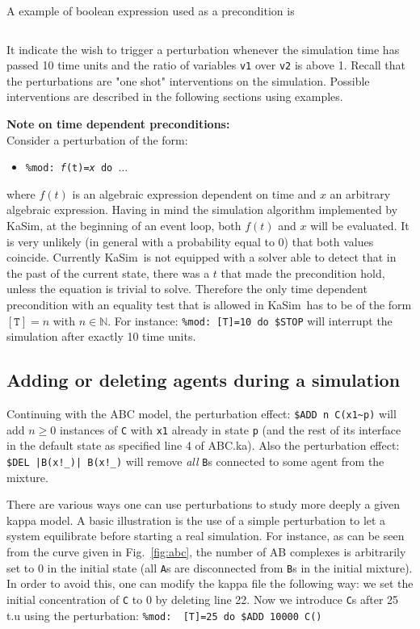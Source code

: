 \documentclass[11pt]{book}
\def\KaSim{\textsf{KaSim}}
\def\ttt#1{\texttt{#1}}
\def\ITE#1{\begin{itemize}#1\end{itemize}}
\def\Nat{\mathbb N}
\begin{document}
A example of boolean expression used as a precondition is
\begin{lstlisting}[language=kappa]
%mod: ([T]>10) && ('v1' / 'v2') > 1 do ...
\end{lstlisting}

It indicate the wish to trigger a perturbation whenever the simulation
time has passed 10 time units and the ratio of variables \ttt{v1} over
\ttt{v2} is above 1. Recall that the perturbations are "one shot"
interventions on the simulation. Possible interventions are described
in the following sections using examples.

\textbf{Note on time dependent preconditions:}
\\Consider a perturbation of the form:
\ITE{
\item[] \ttt{\%mod: {\it f}(t)={\it x} do $\dots$}
}
where $f(t)$ is an algebraic expression dependent on time and $x$ an arbitrary algebraic expression. Having in mind the simulation algorithm implemented by \KaSim, at the beginning of an event loop, both $f(t)$ and $x$ will be evaluated. It is very unlikely (in general with a probability equal to 0) that both values coincide. Currently \KaSim~is not equipped with a solver able to detect that in the past of the current state, there was a $t$ that made the precondition hold, unless the equation is trivial to solve. Therefore the only time dependent precondition with an equality test that is allowed in \KaSim~has to be of the form $\mathtt{[T]=}n$ with $n\in\Nat$. For instance:
\lstinline[language=kappa]*%mod: [T]=10 do $STOP*
will interrupt the simulation after exactly 10 time units.

\subsection{Adding or deleting agents during a simulation}

Continuing with the ABC model, the perturbation effect:
\lstinline[language=kappa]*$ADD n C(x1~p)*
will add $n\geq 0$ instances of \ttt{C} with \ttt{x1} already in state \ttt{p} (and the rest of its interface in the default state as specified line 4 of ABC.ka). Also the perturbation effect:
\lstinline[language=kappa]*$DEL |B(x!_)| B(x!_)*
will remove \emph{all} \ttt{B}s connected to some agent from the mixture.

There are various ways one can use perturbations to study more deeply a given kappa model. A basic illustration is the use of a simple perturbation to let a system equilibrate before starting a real simulation. For instance, as can be seen from the curve given in Fig.~\ref{fig:abc}, the number of AB complexes is arbitrarily set to 0 in the initial state (all \ttt{A}s are disconnected from \ttt{B}s in the initial mixture). In order to avoid this, one can modify the kappa file the following way: we set the initial concentration of \ttt{C} to 0 by deleting line 22. Now we introduce \ttt{C}s after 25 t.u using the perturbation:
\lstinline[language=kappa]*%mod:  [T]=25 do $ADD 10000 C()*
\end{document}
